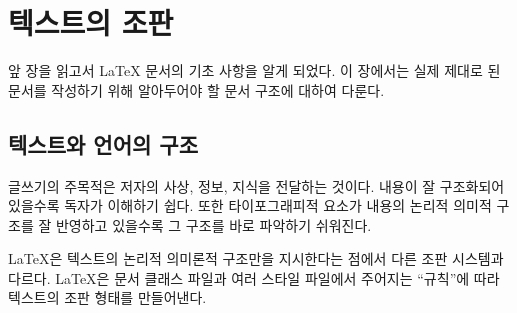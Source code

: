 \chapter{텍스트의 조판}


\begin{intro}
  앞 장을 읽고서 \LaTeX{} 문서의 기초 사항을 알게 되었다. 이 장에서는 
  실제 제대로 된 문서를 작성하기 위해 알아두어야 할 문서 구조에 대하여 다룬다.
\end{intro}

\section{텍스트와 언어의 구조}
%
글쓰기의 주목적은 저자의 사상, 정보, 지식을 전달하는 것이다. 내용이 잘 구조화되어 있을수록 
독자가 이해하기 쉽다. 또한 타이포그래피적 요소가 내용의 논리적 의미적 구조를 잘 반영하고 있을수록 
그 구조를 바로 파악하기 쉬워진다.

\LaTeX 은 텍스트의 논리적 의미론적 구조만을 지시한다는 점에서 다른 조판 시스템과 다르다.
\LaTeX 은 문서 클래스 파일과 여러 스타일 파일에서 주어지는 ``규칙''에 따라 텍스트의 조판 형태를 만들어낸다.

